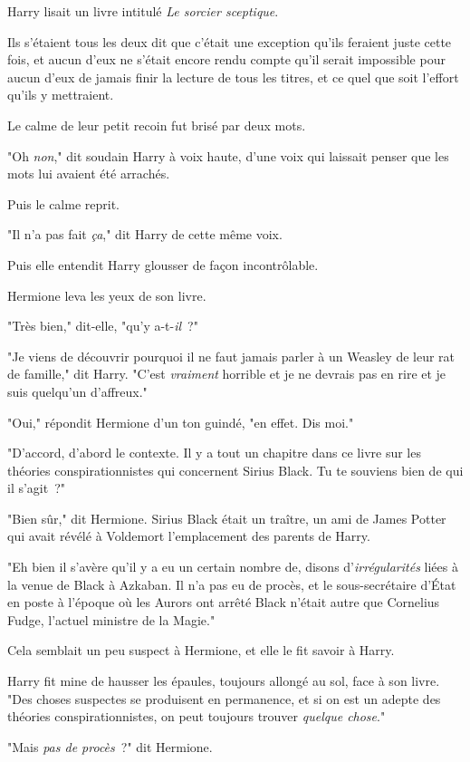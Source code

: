 Harry lisait un livre intitulé \emph{Le sorcier sceptique}.

Ils s'étaient tous les deux dit que c'était une exception qu'ils feraient juste cette fois, et aucun d'eux ne s'était encore rendu compte qu'il serait impossible pour aucun d'eux de jamais finir la lecture de tous les titres, et ce quel que soit l'effort qu'ils y mettraient.

Le calme de leur petit recoin fut brisé par deux mots.

"Oh \emph{non}," dit soudain Harry à voix haute, d'une voix qui laissait penser que les mots lui avaient été arrachés.

Puis le calme reprit.

"Il n'a pas fait \emph{ça}," dit Harry de cette même voix.

Puis elle entendit Harry glousser de façon incontrôlable.

Hermione leva les yeux de son livre.

"Très bien," dit-elle, "qu'y a-t-\emph{il}~?"

"Je viens de découvrir pourquoi il ne faut jamais parler à un Weasley de leur rat de famille," dit Harry. "C'est \emph{vraiment} horrible et je ne devrais pas en rire et je suis quelqu'un d'affreux."

"Oui," répondit Hermione d'un ton guindé, "en effet. Dis moi."

"D'accord, d'abord le contexte. Il y a tout un chapitre dans ce livre sur les théories conspirationnistes qui concernent Sirius Black. Tu te souviens bien de qui il s'agit~?"

"Bien sûr," dit Hermione. Sirius Black était un traître, un ami de James Potter qui avait révélé à Voldemort l'emplacement des parents de Harry.

"Eh bien il s'avère qu'il y a eu un certain nombre de, disons d'\emph{irrégularités} liées à la venue de Black à Azkaban. Il n'a pas eu de procès, et le sous-secrétaire d'État en poste à l'époque où les Aurors ont arrêté Black n'était autre que Cornelius Fudge, l'actuel ministre de la Magie."

Cela semblait un peu suspect à Hermione, et elle le fit savoir à Harry.

Harry fit mine de hausser les épaules, toujours allongé au sol, face à son livre. "Des choses suspectes se produisent en permanence, et si on est un adepte des théories conspirationnistes, on peut toujours trouver \emph{quelque chose}."

"Mais \emph{pas de procès}~?" dit Hermione.

